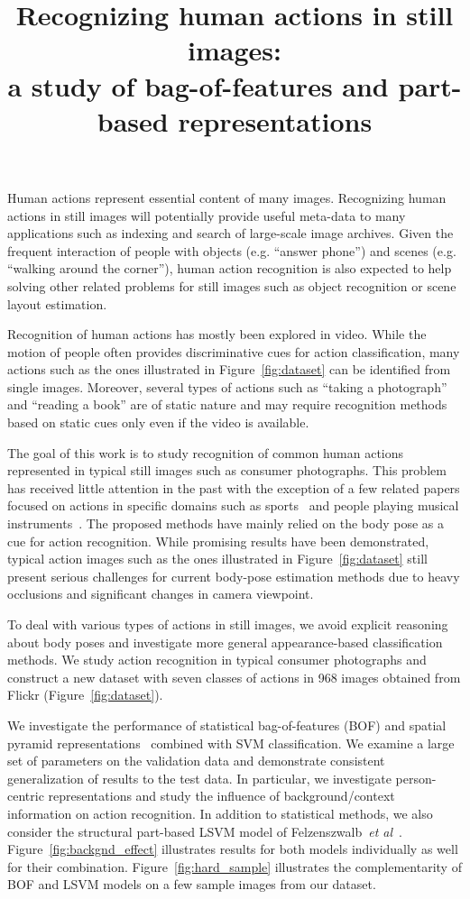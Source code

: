 \documentclass[extendedabs]{bmvc2k}
\title{Recognizing human actions in still images: \\ a study of bag-of-features and part-based representations}
\def\etal{\emph{et al}\bmvaOneDot}
\begin{document}
\maketitle


Human actions represent essential content of many images. Recognizing human actions in still images will potentially provide useful meta-data to many applications such as indexing and search of large-scale image archives. Given the frequent interaction of people with objects (e.g. ``answer phone'') and scenes (e.g. ``walking around the corner''), human action recognition is also expected to help solving other related problems for still images such as object recognition or  scene layout estimation.

Recognition of human actions has mostly been explored in video. While the motion of people often provides discriminative cues for action classification, many actions such as the ones illustrated in Figure~\ref{fig:dataset} can be identified from single images. Moreover, several types of actions such as ``taking a photograph'' and ``reading a book'' are of static nature and may require recognition methods based on static cues only even if the video is available.

The goal of this work is to study recognition of common human actions represented in typical still images such as consumer photographs. This problem has received little attention in the past with the exception of a few related papers focused on actions in specific domains such as sports~\cite{Gupta09, FeiFei10b} and people playing musical instruments~\cite{FeiFei10a}.
The proposed methods have mainly relied on the body pose as a cue for action recognition. While promising results have been demonstrated, typical action images such as the ones illustrated in Figure~\ref{fig:dataset} still present serious challenges for current body-pose estimation methods due  to heavy occlusions and significant changes in camera viewpoint. 

To deal with various types of actions in still images, we avoid explicit reasoning about body poses and investigate more general appearance-based classification methods. We study action recognition in typical consumer photographs and construct a new dataset with seven classes of actions in 968 images obtained from Flickr (Figure~\ref{fig:dataset}).

We investigate the performance of statistical bag-of-features (BOF) and spatial pyramid representations~\cite{Lazebnik06} combined with SVM classification. We examine a large set of parameters on the validation data and demonstrate consistent generalization of results to the test data. In particular, we investigate person-centric representations and study the influence of background/context information on action recognition. 
In addition to statistical methods, we also consider the structural part-based LSVM model of Felzenszwalb~\etal~\cite{Felzenszwalb09}. Figure~\ref{fig:backgnd_effect} illustrates results for both models individually as well for their combination. Figure~\ref{fig:hard_sample} illustrates the complementarity of BOF and LSVM models on a few sample images from our dataset.
\end{document}
